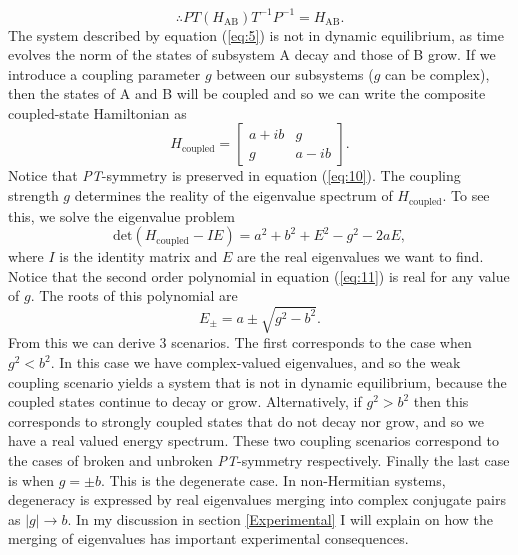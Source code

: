 \documentclass[10pt, a4paper, singlespacing]{report}
\newcommand\PT{\emph{PT}}
\begin{document}
\begin{equation} \label{eq:9}
\therefore PT(H_{\mathrm{AB}})T^{-1}P^{-1} = H_{\mathrm{AB}}.
\end{equation}
The system described by equation (\ref{eq:5}) is not in dynamic equilibrium, as time evolves the norm of the states of subsystem A decay and those of B grow. If we introduce a coupling parameter $g$ between our subsystems ($g$ can be complex), then the states of A and B will be coupled and so we can write the composite coupled-state Hamiltonian as 
\begin{equation} \label{eq:10}
H_{\mathrm{coupled}} = 
\begin{bmatrix}
a+ib & g \\ 
g & a-ib
\end{bmatrix}.
\end{equation}
Notice that \PT-symmetry is preserved in equation (\ref{eq:10}). The coupling strength $g$ determines the reality of the eigenvalue spectrum of $H_{\mathrm{coupled}}$.
To see this, we solve the eigenvalue problem
\begin{equation} \label{eq:11}
\mathrm{det}(H_{\mathrm{coupled}}-IE) = a^2 +b^2 + E^2 -g^2 -2aE,
\end{equation}
where $I$ is the identity matrix and $E$ are the real eigenvalues we want to find. Notice that the second order polynomial in equation (\ref{eq:11}) is real for any value of $g$. The roots of this polynomial are 
\begin{equation} \label{eq:12}
E_{\pm} = a \pm \sqrt{g^2 - b^2}.
\end{equation}
From this we can derive 3 scenarios. The first corresponds to the case when $g^2 < b^2$. In this case we have complex-valued eigenvalues, and so the weak coupling scenario yields a system that is not in dynamic equilibrium, because the coupled states continue to decay or grow. Alternatively, if $g^2 > b^2$ then this corresponds to strongly coupled states that do not decay nor grow, and so we have a real valued energy spectrum. These two coupling scenarios correspond to the cases of broken and unbroken \PT-symmetry respectively. Finally the last case is when $g = \pm b$. This is the degenerate case. In non-Hermitian systems, degeneracy is expressed by real eigenvalues merging into complex conjugate pairs as $|g| \rightarrow b$. In my discussion in section \ref{Experimental} I will explain on how the merging of eigenvalues has important experimental consequences.
\end{document}
